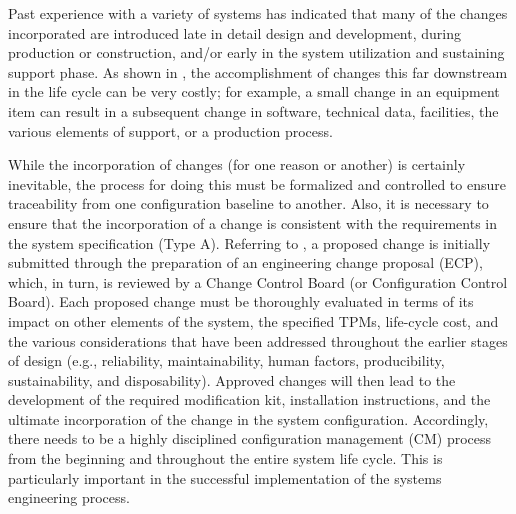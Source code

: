 Past experience with a variety of systems has indicated that many of the changes incorporated are introduced late in detail design and development, during production or construction, and/or early in the system utilization and sustaining support phase. As shown in , the accomplishment of changes this far downstream in the life cycle can be very costly; for example, a small change in an equipment item can result in a subsequent change in software, technical data, facilities, the various elements of support, or a production process.

While the incorporation of changes (for one reason or another) is certainly inevitable, the process for doing this must be formalized and controlled to ensure traceability from one configuration baseline to another. Also, it is necessary to ensure that the incorporation of a change is consistent with the requirements in the system specification (Type A). Referring to , a proposed change is initially submitted through the preparation of an engineering change proposal (ECP), which, in turn, is reviewed by a Change Control Board (or Configuration Control Board). Each proposed change must be thoroughly evaluated in terms of its impact on other elements of the system, the specified TPMs, life-cycle cost, and the various considerations that have been addressed throughout the earlier stages of design (e.g., reliability, maintainability, human factors, producibility, sustainability, and disposability). Approved changes will then lead to the development of the required modification kit, installation instructions, and the ultimate incorporation of the change in the system configuration. Accordingly, there needs to be a highly disciplined configuration management (CM) process from the beginning and throughout the entire system life cycle. This is particularly important in the successful implementation of the systems engineering process.
